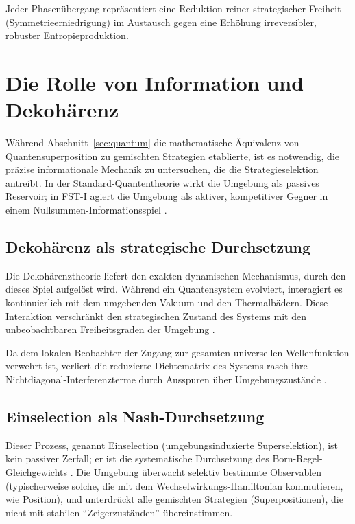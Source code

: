 \documentclass[12pt,a4paper]{article}
\theoremstyle{remark}
\begin{document}
Jeder Phasen\"ubergang repr\"asentiert eine Reduktion reiner strategischer Freiheit (Symmetrieerniedrigung) im Austausch gegen eine Erh\"ohung irreversibler, robuster Entropieproduktion.

\section{Die Rolle von Information und Dekoh\"arenz}
\label{sec:decoherence}

W\"ahrend Abschnitt~\ref{sec:quantum} die mathematische \"Aquivalenz von Quantensuperposition zu gemischten Strategien etablierte, ist es notwendig, die pr\"azise informationale Mechanik zu untersuchen, die die Strategieselektion antreibt. In der Standard-Quantentheorie wirkt die Umgebung als passives Reservoir; in FST-I agiert die Umgebung als aktiver, kompetitiver Gegner in einem Nullsummen-Informationsspiel \citep{DynamicalOrigin2005}.

\subsection{Dekoh\"arenz als strategische Durchsetzung}

Die Dekoh\"arenztheorie liefert den exakten dynamischen Mechanismus, durch den dieses Spiel aufgel\"ost wird. W\"ahrend ein Quantensystem evolviert, interagiert es kontinuierlich mit dem umgebenden Vakuum und den Thermalbädern. Diese Interaktion verschr\"ankt den strategischen Zustand des Systems mit den unbeobachtbaren Freiheitsgraden der Umgebung \citep{MeasurementClassical}.

Da dem lokalen Beobachter der Zugang zur gesamten universellen Wellenfunktion verwehrt ist, verliert die reduzierte Dichtematrix des Systems rasch ihre Nichtdiagonal-Interferenzterme durch Ausspuren \"uber Umgebungszust\"ande \citep{Lindblad2015}.

\subsection{Einselection als Nash-Durchsetzung}

Dieser Prozess, genannt Einselection (umgebungsinduzierte Superselektion), ist kein passiver Zerfall; er ist die systematische Durchsetzung des Born-Regel-Gleichgewichts \citep{Zurek2003}. Die Umgebung \"uberwacht selektiv bestimmte Observablen (typischerweise solche, die mit dem Wechselwirkungs-Hamiltonian kommutieren, wie Position), und unterdr\"uckt alle gemischten Strategien (Superpositionen), die nicht mit stabilen ``Zeigerzust\"anden'' \"ubereinstimmen.
\end{document}
